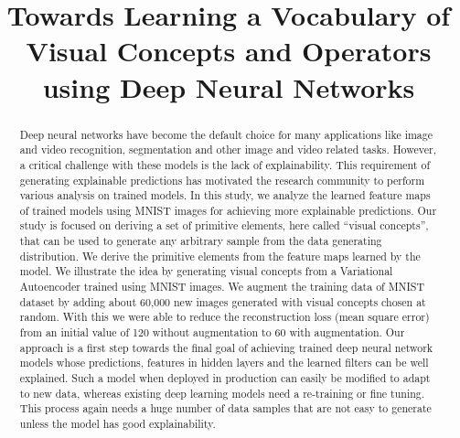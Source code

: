 \documentclass[conference]{IEEEtran}
\begin{document}
\title{Towards Learning a Vocabulary of Visual Concepts and Operators using Deep Neural Networks}

\author{

\and

}

\maketitle

\begin{abstract}
 Deep neural networks have become the default choice for many applications like image and video recognition, segmentation and other image and video related tasks.
    However, a critical  challenge with these models is the lack of explainability.
    This requirement of generating explainable predictions has motivated the research community to perform various analysis on trained models.
    In this study, we analyze the learned feature maps of trained models using MNIST images for achieving more explainable predictions.
    Our study is focused on deriving a set of primitive elements, here called “visual concepts”, that can be used to generate any arbitrary sample from the data generating distribution.
    We derive the primitive elements from the feature maps learned by the model.
    We illustrate the idea by generating visual concepts from a Variational Autoencoder  trained using MNIST images.
    We augment the training data of MNIST dataset by adding about 60,000 new images generated with visual concepts chosen at random.
    With this we were able to reduce the reconstruction loss (mean square error) from an initial value of 120 without augmentation to 60 with augmentation.
    Our approach is a first step towards the final goal of achieving trained deep neural network models whose predictions, features in hidden layers and the learned filters can be well explained.
    Such a model when deployed in production can easily be modified to  adapt to new data, whereas existing deep learning models need a re-training or fine tuning.
    This process again needs a huge number of data samples that are not easy to generate unless the model has good explainability.
\end{abstract}
\end{document}
